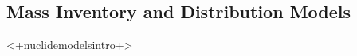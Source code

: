 \subsection{Mass Inventory and Distribution Models}\label{sec:mass_balance}








<+nuclidemodelsintro+>
